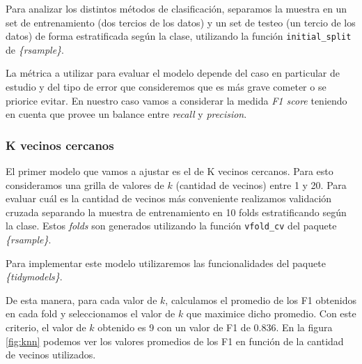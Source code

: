 \documentclass[
]{article}
\begin{document}
Para analizar los distintos métodos de clasificación, separamos la
muestra en un set de entrenamiento (dos tercios de los datos) y un set
de testeo (un tercio de los datos) de forma estratificada según la
clase, utilizando la función \texttt{initial\_split} de
\emph{\{rsample\}}.

La métrica a utilizar para evaluar el modelo depende del caso en
particular de estudio y del tipo de error que consideremos que es más
grave cometer o se priorice evitar. En nuestro caso vamos a considerar
la medida \emph{F1 score} teniendo en cuenta que provee un balance entre
\emph{recall} y \emph{precision}.

\hypertarget{k-vecinos-cercanos}{%
\subsubsection{K vecinos cercanos}\label{k-vecinos-cercanos}}

El primer modelo que vamos a ajustar es el de K vecinos cercanos. Para
esto consideramos una grilla de valores de \(k\) (cantidad de vecinos)
entre 1 y 20. Para evaluar cuál es la cantidad de vecinos más
conveniente realizamos validación cruzada separando la muestra de
entrenamiento en 10 folds estratificando según la clase. Estos
\emph{folds} son generados utilizando la función \texttt{vfold\_cv} del
paquete \emph{\{rsample\}}.

Para implementar este modelo utilizaremos las funcionalidades del
paquete \emph{\{tidymodels\}}.

De esta manera, para cada valor de \(k\), calculamos el promedio de los
F1 obtenidos en cada fold y seleccionamos el valor de \(k\) que maximice
dicho promedio. Con este criterio, el valor de \(k\) obtenido es 9 con
un valor de F1 de 0.836. En la figura \ref{fig:knn} podemos ver los
valores promedios de los F1 en función de la cantidad de vecinos
utilizados.
\end{document}
